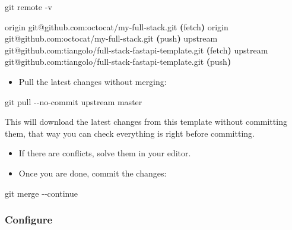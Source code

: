\documentclass[
]{article}
\newenvironment{Shaded}{}{}
\newcommand{\AttributeTok}[1]{\textcolor[rgb]{0.49,0.56,0.16}{#1}}
\newcommand{\ErrorTok}[1]{\textcolor[rgb]{1.00,0.00,0.00}{\textbf{#1}}}
\newcommand{\ExtensionTok}[1]{#1}
\newcommand{\FunctionTok}[1]{\textcolor[rgb]{0.02,0.16,0.49}{#1}}
\newcommand{\KeywordTok}[1]{\textcolor[rgb]{0.00,0.44,0.13}{\textbf{#1}}}
\newcommand{\NormalTok}[1]{#1}
\providecommand{\tightlist}{%
  \setlength{\itemsep}{0pt}\setlength{\parskip}{0pt}}
\begin{document}
\hypertarget{cb6}{}
\begin{Shaded}
\begin{Highlighting}[]
\FunctionTok{git}\NormalTok{ remote }\AttributeTok{{-}v}

\ExtensionTok{origin}\NormalTok{    git@github.com:octocat/my{-}full{-}stack.git }\ErrorTok{(}\ExtensionTok{fetch}\KeywordTok{)}
\ExtensionTok{origin}\NormalTok{    git@github.com:octocat/my{-}full{-}stack.git }\ErrorTok{(}\ExtensionTok{push}\KeywordTok{)}
\ExtensionTok{upstream}\NormalTok{    git@github.com:tiangolo/full{-}stack{-}fastapi{-}template.git }\ErrorTok{(}\ExtensionTok{fetch}\KeywordTok{)}
\ExtensionTok{upstream}\NormalTok{    git@github.com:tiangolo/full{-}stack{-}fastapi{-}template.git }\ErrorTok{(}\ExtensionTok{push}\KeywordTok{)}
\end{Highlighting}
\end{Shaded}

\begin{itemize}
\tightlist
\item
  Pull the latest changes without merging:
\end{itemize}

\hypertarget{cb7}{}
\begin{Shaded}
\begin{Highlighting}[]
\FunctionTok{git}\NormalTok{ pull }\AttributeTok{{-}{-}no{-}commit}\NormalTok{ upstream master}
\end{Highlighting}
\end{Shaded}

This will download the latest changes from this template without
committing them, that way you can check everything is right before
committing.

\begin{itemize}
\item
  If there are conflicts, solve them in your editor.
\item
  Once you are done, commit the changes:
\end{itemize}

\hypertarget{cb8}{}
\begin{Shaded}
\begin{Highlighting}[]
\FunctionTok{git}\NormalTok{ merge }\AttributeTok{{-}{-}continue}
\end{Highlighting}
\end{Shaded}

\hypertarget{configure}{%
\subsubsection{Configure}\label{configure}}
\end{document}
